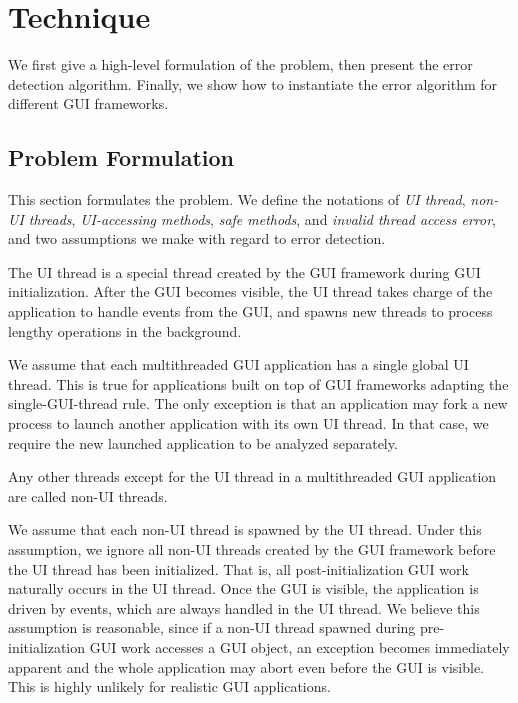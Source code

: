 \section{Technique}
\label{sec:technique}

We first give a high-level formulation of the problem, then present
the error detection algorithm. Finally, we show how to instantiate
the error algorithm for different GUI frameworks.


\subsection{Problem Formulation}

This section formulates the problem. We define the
notations of \textit{UI thread}, \textit{non-UI threads},
\textit{UI-accessing methods},
 \textit{safe methods}, and \textit{invalid thread access error}, and
two assumptions we make with regard to error detection.

 {The UI thread
is a special thread created by the GUI framework during
GUI initialization. After the GUI becomes visible, the UI thread
takes charge of the application to handle events from the GUI,
and spawns new threads to process lengthy operations in the background. }\vspace{1mm}

 {We assume that each multithreaded
GUI application has a single global UI thread. This is true for applications
built on top of GUI frameworks adapting the single-GUI-thread rule. The
only exception is that 
 an application may fork a new process to launch another
application with its own UI thread. In that case, we require the new
launched application to be analyzed separately.}\vspace{1mm}

 {Any other
threads except for the UI thread in a multithreaded GUI application
 are called non-UI threads.}\vspace{1mm}

 { We assume that each non-UI
thread is spawned by the UI thread. Under this assumption,
we ignore all non-UI threads created by the GUI framework
before the UI thread has been initialized. That is, all post-initialization
GUI work naturally occurs in the UI thread. Once the GUI is visible, the
application is driven by events, which are always handled in the UI thread.
We believe this assumption is reasonable, since if a non-UI thread 
spawned during pre-initialization GUI work accesses a GUI object, an exception becomes
immediately apparent and the whole application may abort even before the
GUI is visible. This is highly unlikely for realistic GUI
applications.
}\vspace{1mm}

